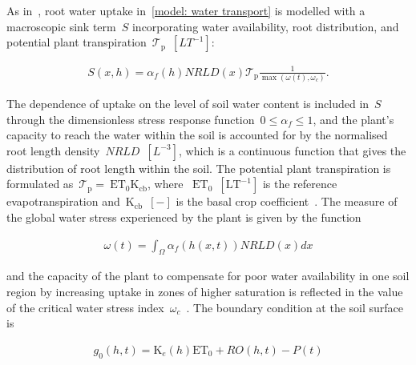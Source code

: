 \documentclass[11pt,a4paper]{article}
\numberwithin{equation}{section}
\begin{document}
As in~\citep{vsimuunek2009modeling}, root water uptake in~\eqref{model: water transport} is modelled with a macroscopic sink term~$S$ incorporating water availability, root distribution, and potential plant transpiration~$\mathcal{T}_\text{p}$~$[LT^{-1}]$:
\begin{linenomath*}
	\begin{equation}\label{model: root water uptake}
		\begin{aligned}
			S(x, h) = \alpha_f(h)NRLD(x)\mathcal{T}_\text{p}\frac{1}{\max{(\omega(t),\omega_c)}}.
		\end{aligned}
	\end{equation}
\end{linenomath*}   
The dependence of uptake on the level of soil water content is included in~$S$ through the dimensionless stress response function~$0\leq\alpha_f\leq1$, and  the plant's capacity to reach the water within the soil is accounted for by the normalised root length density~$NRLD$~$[L^{-3}]$, which is a continuous function that gives the distribution of root length within the soil. The potential plant transpiration is formulated as~$\mathcal{T}_\text{p} =~\text{ET}_0\text{K}_{\text{cb}}$, where ~$\text{ET}_0$~$[\text{LT}^{-1}]$ is the reference evapotranspiration and~$\text{K}_{\text{cb}}$~$[-]$ is the basal crop coefficient~\citep{allen1998crop}. The measure of the global water stress experienced by the plant is given by the function
\begin{linenomath*}
	\begin{equation}\label{model: global water stress}
		\begin{aligned}
			\omega(t) = \int_\Omega\alpha_f(h(x, t))NRLD(x)dx
		\end{aligned}
	\end{equation}
\end{linenomath*}		
and the capacity of the plant to compensate for poor water availability in one soil region by increasing uptake in zones of higher saturation is reflected in the value of the critical water stress index~$\omega_c$~\citep{cai2018parameterization}. The boundary condition at the soil surface is
\begin{linenomath*}
	\begin{equation}\label{model: boundary condition soil surface}
		\begin{aligned}
			g_0(h, t) = \text{K}_e(h)\text{ET}_0 + RO(h,t) - P(t) 
		\end{aligned}
	\end{equation}
\end{linenomath*}
\end{document}
